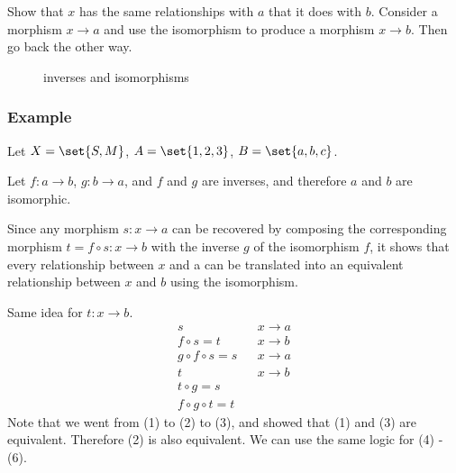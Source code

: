 \begin{ttta}
	Show that $x$ has the same relationships with $a$ that it does with $b$.
	Consider a morphism $x\rightarrow a$ and use the isomorphism to produce a
	morphism $x\rightarrow b$. Then go back the other way.
\end{ttta}
\begin{figure}[H]
	\begin{center}
		
	\end{center}
	\caption{inverses and isomorphisms}
\end{figure}
\subsubsection{Example}
\begin{proofitem}
	\item Let $X=\set{S, M}$, $A=\set{1, 2, 3}$, $B=\set{a, b, c}$.
\end{proofitem}

\begin{proofitem}
	\item Let $f:a\rightarrow b$, $g:b\rightarrow a$, and $f$ and $g$ are inverses,
	and therefore $a$ and $b$ are isomorphic.
	\item
	Since any morphism $s: x \rightarrow a$ can be recovered by composing the
	corresponding morphism $t = f \circ s : x \rightarrow b$ with the inverse
	$g$ of the isomorphism $f$, it shows that every relationship between $x$ and
	a can be translated into an equivalent relationship between $x$ and $b$
	using the isomorphism.
	\item Same idea for $t: x\rightarrow b$.
	\setcounter{equation}{0}
	\begin{align}
		s                  &  & x\rightarrow a \\
		f\circ s = t       &  & x\rightarrow b \\
		g\circ f\circ s= s &  & x\rightarrow a \\
		t                  &  & x\rightarrow b \\
		t\circ g = s                           \\
		f\circ g\circ t= t
	\end{align}
	Note that we went from (1) to (2) to (3), and showed that (1) and (3) are
	equivalent. Therefore (2) is also equivalent. We can use the same logic for (4)
	- (6).
\end{proofitem}

